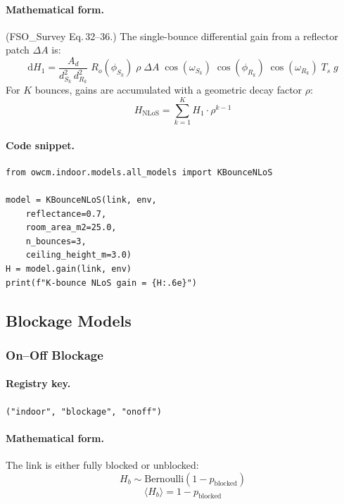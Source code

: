 \documentclass[11pt,a4paper]{article}
\begin{document}
\paragraph{Mathematical form.}
(FSO\_Survey Eq.\,32--36.)  The single-bounce differential gain from a
reflector patch $\Delta A$ is:
\begin{equation}
\mathrm{d}H_1 = \frac{A_d}{d_{S_k}^2 \, d_{R_k}^2}\;
R_o(\phi_{S_k})\;\rho\;\Delta A\;
\cos(\omega_{S_k})\;\cos(\phi_{R_k})\;\cos(\omega_{R_k})\;T_s\;g
\end{equation}
For $K$ bounces, gains are accumulated with a geometric decay factor $\rho$:
\begin{equation}
\boxed{H_{\text{NLoS}} = \sum_{k=1}^{K} H_1 \cdot \rho^{k-1}}
\end{equation}

\paragraph{Code snippet.}
\begin{lstlisting}
from owcm.indoor.models.all_models import KBounceNLoS

model = KBounceNLoS(link, env,
    reflectance=0.7,
    room_area_m2=25.0,
    n_bounces=3,
    ceiling_height_m=3.0)
H = model.gain(link, env)
print(f"K-bounce NLoS gain = {H:.6e}")
\end{lstlisting}

\subsection{Blockage Models}

\subsubsection{On--Off Blockage}
\label{sec:onoff_blockage}

\paragraph{Registry key.} \texttt{("indoor", "blockage", "onoff")}

\paragraph{Mathematical form.}
The link is either fully blocked or unblocked:
\begin{equation}
H_b \sim \text{Bernoulli}(1 - p_{\text{blocked}})
\end{equation}
\begin{equation}
\boxed{\langle H_b \rangle = 1 - p_{\text{blocked}}}
\end{equation}
\end{document}
